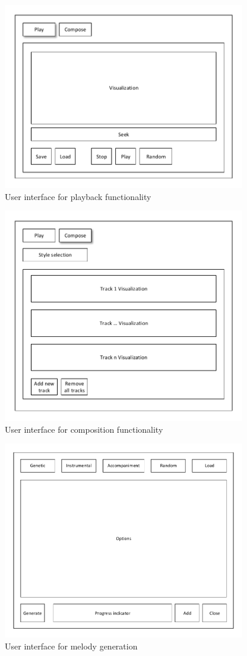 \begin{figure}
\centerline{\includegraphics[width=400px]{../images/ui_play.pdf}}
\caption{User interface for playback functionality}
\label{ims:uiplay}
\end{figure}

\begin{figure}
\centerline{\includegraphics[width=400px]{../images/ui_compose.pdf}}
\caption{User interface for composition functionality}
\label{ims:uicompose}
\end{figure}

\begin{figure}
\centerline{\includegraphics[width=400px]{../images/ui_track.pdf}}
\caption{User interface for melody generation}
\label{ims:uitrack}
\end{figure}

